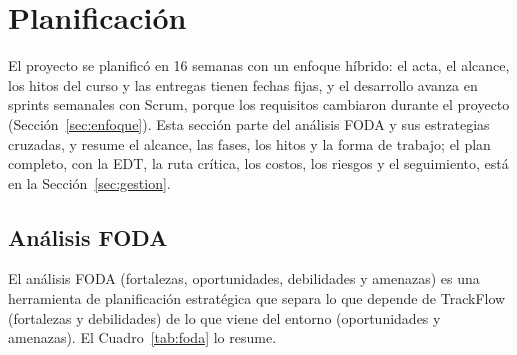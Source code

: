 \documentclass[12pt,a4paper]{article}
\begin{document}
\section{Planificación}
\label{sec:planificacion}

El proyecto se planificó en 16 semanas con un enfoque híbrido: el acta, el
alcance, los hitos del curso y las entregas tienen fechas fijas, y el
desarrollo avanza en sprints semanales con Scrum, porque los requisitos
cambiaron durante el proyecto (Sección~\ref{sec:enfoque}). Esta sección
parte del análisis FODA y sus estrategias cruzadas, y resume el alcance, las
fases, los hitos y la forma de trabajo; el plan
completo, con la EDT, la ruta crítica, los costos, los riesgos y el
seguimiento, está en la Sección~\ref{sec:gestion}.

\subsection{Análisis FODA}
\label{sec:foda}

El análisis FODA (fortalezas, oportunidades, debilidades y amenazas) es una
herramienta de planificación estratégica que separa lo que depende de
TrackFlow (fortalezas y debilidades) de lo que viene del entorno
(oportunidades y amenazas). El Cuadro~\ref{tab:foda} lo resume.
\end{document}
